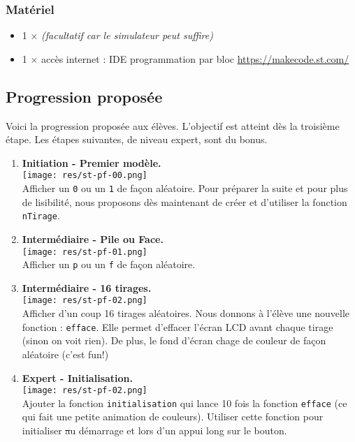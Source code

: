 \subsubsection{Matériel}
\begin{itemize}
    \item 1 $\times$ \matosSt \emph{(facultatif car le simulateur peut suffire)}
    \item 1 $\times$ accès internet : IDE programmation par bloc \url{https://makecode.st.com/}
\end{itemize}


\newpage
\subsection{Progression proposée}

\begin{methode}
Voici la progression proposée aux élèves. L'objectif est atteint dès la troisième étape. Les étapes suivantes, de niveau expert, sont du bonus.
\begin{enumerate}
    \item
        \textbf{Initiation - Premier modèle.} \\
        \texttt{[image: res/st-pf-00.png]}\\Afficher un \texttt{0} ou un \texttt{1} de façon aléatoire. Pour préparer la suite et pour plus de lisibilité, nous proposons dès maintenant de créer et d'utiliser la fonction \texttt{nTirage}.
    \item 
        \textbf{Intermédiaire - Pile ou Face.}\\
        \texttt{[image: res/st-pf-01.png]}\\Afficher un \texttt{p} ou un \texttt{f} de façon aléatoire.
    \item 
        \textbf{Intermédiaire - 16 tirages.}\\ 
        \texttt{[image: res/st-pf-02.png]}\\Afficher d'un coup 16 tirages aléatoires. Nous donnons à l'élève une nouvelle fonction : \texttt{efface}. Elle permet d'effacer l'écran LCD avant chaque tirage (sinon on voit rien). De plus, le fond d'écran chage de couleur de façon aléatoire (c'est fun!)
    \item
        \textbf{Expert - Initialisation.} \\
        \texttt{[image: res/st-pf-02.png]}\\Ajouter la fonction \texttt{initialisation} qui lance 10 fois la fonction \texttt{efface} (ce qui fait une petite animation de couleurs). Utiliser cette fonction pour initialiser \st au démarrage et lors d'un appui long sur le bouton.

\end{enumerate}
\end{methode}
